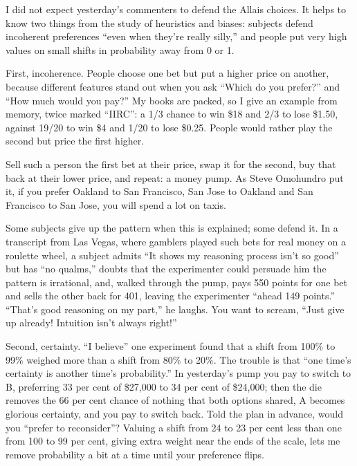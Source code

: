 
I did not expect yesterday's commenters to defend the Allais choices. It helps to know two things from the study of heuristics and biases: subjects defend incoherent preferences ``even when they're really silly,'' and people put very high values on small shifts in probability away from 0 or 1. 

First, incoherence. People choose one bet but put a higher price on another, because different features stand out when you ask ``Which do you prefer?'' and ``How much would you pay?'' My books are packed, so I give an example from memory, twice marked ``IIRC'': a 1/3 chance to win \$18 and 2/3 to lose \$1.50, against 19/20 to win \$4 and 1/20 to lose \$0.25. People would rather play the second but price the first higher. 

Sell such a person the first bet at their price, swap it for the second, buy that back at their lower price, and repeat: a money pump. As Steve Omohundro put it, if you prefer Oakland to San Francisco, San Jose to Oakland and San Francisco to San Jose, you will spend a lot on taxis.

Some subjects give up the pattern when this is explained; some defend it. In a transcript from Las Vegas, where gamblers played such bets for real money on a roulette wheel, a subject admits ``It shows my reasoning process isn't so good'' but has ``no qualms,'' doubts that the experimenter could persuade him the pattern is irrational, and, walked through the pump, pays 550 points for one bet and sells the other back for 401, leaving the experimenter ``ahead 149 points.'' ``That's good reasoning on my part,'' he laughs. You want to scream, ``Just give up already! Intuition isn't always right!''

Second, certainty. ``I believe'' one experiment found that a shift from 100\% to 99\% weighed more than a shift from 80\% to 20\%.  The trouble is that ``one time's certainty is another time's probability.'' In yesterday's pump you pay to switch to B, preferring 33 per cent of \$27,000 to 34 per cent of \$24,000; then the die removes the 66 per cent chance of nothing that both options shared, A becomes glorious certainty, and you pay to switch back. Told the plan in advance, would you ``prefer to reconsider''? Valuing a shift from 24 to 23 per cent less than one from 100 to 99 per cent, giving extra weight near the ends of the scale, lets me remove probability a bit at a time until your preference flips.

